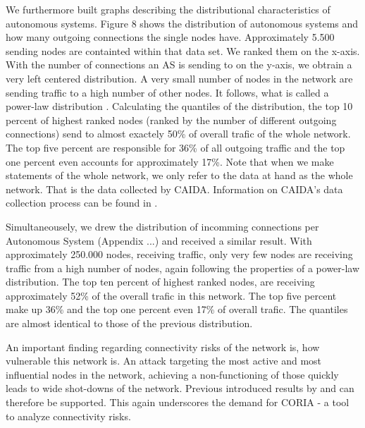 \documentclass[conference, 11pt]{IEEEtran}
\begin{document}
We furthermore built graphs describing the distributional characteristics of autonomous systems. Figure 8 shows the distribution of autonomous systems and how many outgoing connections the single nodes have. Approximately 5.500 sending nodes are containted within that data set. We ranked them on the x-axis. With the number of connections an AS is sending to on the y-axis, we obtrain a very left centered distribution. A very small number of nodes in the network are sending traffic to a high number of other nodes. It follows, what is called a power-law distribution  \cite{powerlawCitation}. Calculating the quantiles of the distribution, the top 10 percent of highest ranked nodes (ranked by the number of different outgoing connections) send to almost exactely 50\% of overall trafic of the whole network. The top five percent are responsible for 36\% of all outgoing traffic and the top one percent even accounts for approximately 17\%. Note that when we make statements of the whole network, we only refer to the data at hand as the whole network. That is the data collected by CAIDA. Information on CAIDA's data collection process can be found in \cite{CaidaDataCollection} . 


Simultaneousely, we drew the distribution of incomming connections per Autonomous System (Appendix ...) and received a similar result. With approximately 250.000 nodes, receiving traffic, only very few nodes are receiving traffic from a high number of nodes, again following the properties of a power-law distribution. The top ten percent of highest ranked nodes, are receiving approximately 52\% of the overall trafic in this network. The top five percent make up 36\% and the top one percent even 17\% of overall trafic. The quantiles are almost identical to those of the previous distribution. 



 


An important finding regarding connectivity risks of the network is, how vulnerable this network is. An attack targeting the most active and most influential nodes in the network, achieving a non-functioning of those quickly leads to wide shot-downs of the network. Previous introduced results by \cite{powerlawCitation} and \cite{owningInternet} can therefore be supported.  This again underscores the demand for CORIA - a tool to analyze connectivity risks. 
\end{document}
